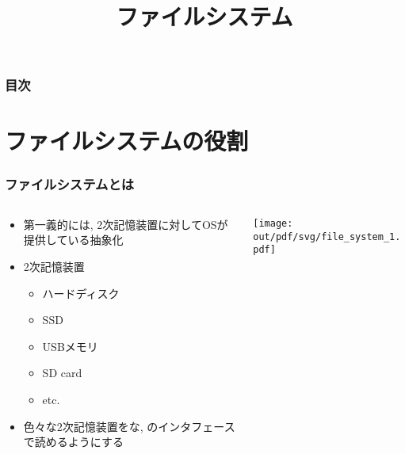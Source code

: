 \documentclass[12pt,dvipdfmx]{beamer}
\title{ファイルシステム}
\begin{document}
\maketitle

\begin{frame}
\frametitle{目次}
\tableofcontents
\end{frame}

\section{ファイルシステムの役割}

\begin{frame}
  \frametitle{ファイルシステムとは}
  \begin{columns}
    \begin{column}{0.5\textwidth}
      \begin{itemize}
      \item 第一義的には, 2次記憶装置に対してOSが提供している抽象化
      \item 2次記憶装置
        \begin{itemize}
        \item ハードディスク
        \item SSD
        \item USBメモリ
        \item SD card
        \item etc.
        \end{itemize}
      \item 色々な2次記憶装置をな,
        のインタフェースで読めるようにする
      \end{itemize}
    \end{column}
    \begin{column}{0.5\textwidth}
      \texttt{[image: out/pdf/svg/file\_system\_1.pdf]}
    \end{column}
  \end{columns}
\end{frame}
\end{document}
